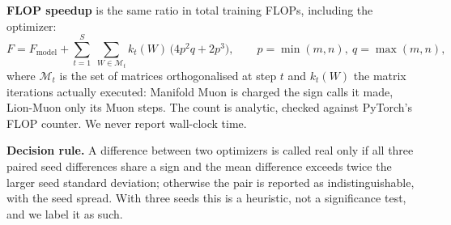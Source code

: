 \textbf{FLOP speedup} is the same ratio in total training FLOPs, including the optimizer:
\begin{equation}
F = F_{\text{model}} + \sum_{t=1}^{S}\ \sum_{W\in\mathcal M_t} k_t(W)\,\bigl(4p^2q+2p^3\bigr),
\qquad p=\min(m,n),\ q=\max(m,n),
\end{equation}
where $\mathcal M_t$ is the set of matrices orthogonalised at step $t$ and $k_t(W)$ the matrix
iterations actually executed: Manifold Muon is charged the sign calls it made, Lion-Muon only
its Muon steps. The count is analytic, checked against PyTorch's FLOP counter. We never report
wall-clock time.

\textbf{Decision rule.} A difference between two optimizers is called real only if all three
paired seed differences share a sign and the mean difference exceeds twice the larger seed
standard deviation; otherwise the pair is reported as indistinguishable, with the seed spread.
With three seeds this is a heuristic, not a significance test, and we label it as such.


